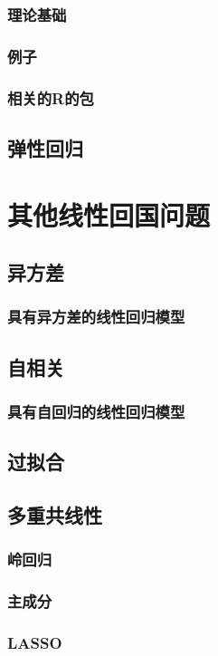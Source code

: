 \documentclass{amsart}
\begin{document}
\subsubsection{理论基础}
\subsubsection{例子}
\subsubsection{相关的R的包}

\subsection{弹性回归}

\section{其他线性回国问题}

\subsection{异方差}
\subsubsection{具有异方差的线性回归模型}
\subsection{自相关}
\subsubsection{具有自回归的线性回归模型}

\subsection{过拟合}
\subsection{多重共线性}
\subsubsection{岭回归}
\subsubsection{主成分}
\subsubsection{LASSO}
\end{document}
